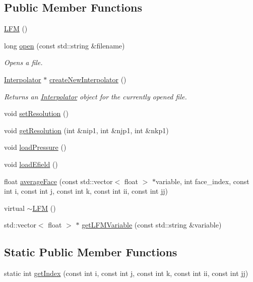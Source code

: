 \subsection*{Public Member Functions}
\begin{DoxyCompactItemize}
\item 
\hyperlink{classccmc_1_1_l_f_m_a9fb6554dddcf4bb70bbb19622130cf69}{L\-F\-M} ()
\item 
long \hyperlink{classccmc_1_1_l_f_m_a8a9e74e6951db85a54cffbf6c1305f9f}{open} (const std\-::string \&filename)
\begin{DoxyCompactList}\small\item\em Opens a file.  \end{DoxyCompactList}\item 
\hyperlink{classccmc_1_1_interpolator}{Interpolator} $\ast$ \hyperlink{classccmc_1_1_l_f_m_a6cda025f32e66de186e723f7d16e8639}{create\-New\-Interpolator} ()
\begin{DoxyCompactList}\small\item\em Returns an \hyperlink{classccmc_1_1_interpolator}{Interpolator} object for the currently opened file. \end{DoxyCompactList}\item 
void \hyperlink{classccmc_1_1_l_f_m_a3b30357fb47547a19b480a824aae19ef}{set\-Resolution} ()
\item 
void \hyperlink{classccmc_1_1_l_f_m_ae4a27c5fc9f52300575eb495beaeda9c}{get\-Resolution} (int \&nip1, int \&njp1, int \&nkp1)
\item 
void \hyperlink{classccmc_1_1_l_f_m_a50299b9da81da02df430d0079d8deaf5}{load\-Pressure} ()
\item 
void \hyperlink{classccmc_1_1_l_f_m_a3159c537415c5da69c86ed5bc8791019}{load\-Efield} ()
\item 
float \hyperlink{classccmc_1_1_l_f_m_a950345d5557b42e68ebd8e8d8b4a4a44}{average\-Face} (const std\-::vector$<$ float $>$ $\ast$variable, int face\-\_\-index, const int i, const int j, const int k, const int ii, const int jj)
\item 
virtual \hyperlink{classccmc_1_1_l_f_m_ab7867c983e99e38e19e120dcbf38420c}{$\sim$\-L\-F\-M} ()
\item 
std\-::vector$<$ float $>$ $\ast$ \hyperlink{classccmc_1_1_l_f_m_a72536081ec39b9f9620b49e4a4ac58d5}{get\-L\-F\-M\-Variable} (const std\-::string \&variable)
\end{DoxyCompactItemize}
\subsection*{Static Public Member Functions}
\begin{DoxyCompactItemize}
\item 
static int \hyperlink{classccmc_1_1_l_f_m_ace1eb0153ce938756984444bba34a7cb}{get\-Index} (const int i, const int j, const int k, const int ii, const int jj)
\end{DoxyCompactItemize}
